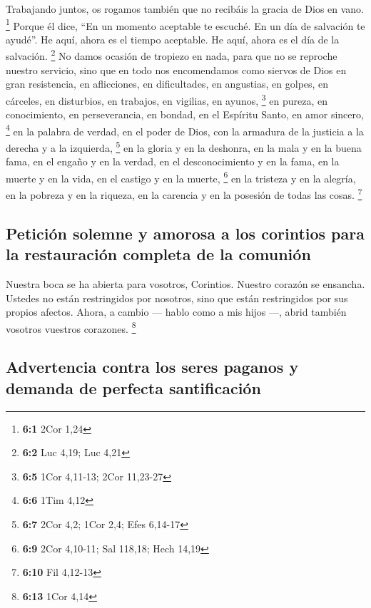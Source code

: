 \begin{paracol}{2}
 Trabajando juntos, os rogamos también que no recibáis la
gracia de Dios en vano. \footnote{\textbf{6:1} 2Cor 1,24} 
Porque él dice, ``En un momento aceptable te escuché. En un día de
salvación te ayudé''. He aquí, ahora es el tiempo aceptable. He aquí,
ahora es el día de la salvación. \footnote{\textbf{6:2} Luc 4,19; Luc
  4,21}  No damos ocasión de tropiezo en nada, para que no
se reproche nuestro servicio,  sino que en todo nos
encomendamos como siervos de Dios en gran resistencia, en aflicciones,
en dificultades, en angustias,  en golpes, en cárceles, en
disturbios, en trabajos, en vigilias, en ayunos, \footnote{\textbf{6:5}
  1Cor 4,11-13; 2Cor 11,23-27}  en pureza, en
conocimiento, en perseverancia, en bondad, en el Espíritu Santo, en amor
sincero, \footnote{\textbf{6:6} 1Tim 4,12}  en la palabra
de verdad, en el poder de Dios, con la armadura de la justicia a la
derecha y a la izquierda, \footnote{\textbf{6:7} 2Cor 4,2; 1Cor 2,4;
  Efes 6,14-17}  en la gloria y en la deshonra, en la mala
y en la buena fama, en el engaño y en la verdad,  en el
desconocimiento y en la fama, en la muerte y en la vida, en el castigo y
en la muerte, \footnote{\textbf{6:9} 2Cor 4,10-11; Sal 118,18; Hech
  14,19}  en la tristeza y en la alegría, en la pobreza y
en la riqueza, en la carencia y en la posesión de todas las cosas.
\footnote{\textbf{6:10} Fil 4,12-13}

\hypertarget{peticiuxf3n-solemne-y-amorosa-a-los-corintios-para-la-restauraciuxf3n-completa-de-la-comuniuxf3n}{%
\subsection{Petición solemne y amorosa a los corintios para la
restauración completa de la
comunión}\label{peticiuxf3n-solemne-y-amorosa-a-los-corintios-para-la-restauraciuxf3n-completa-de-la-comuniuxf3n}}

 Nuestra boca se ha abierta para vosotros, Corintios.
Nuestro corazón se ensancha.  Ustedes no están
restringidos por nosotros, sino que están restringidos por sus propios
afectos.  Ahora, a cambio --- hablo como a mis hijos ---,
abrid también vosotros vuestros corazones. \footnote{\textbf{6:13} 1Cor
  4,14}

\hypertarget{advertencia-contra-los-seres-paganos-y-demanda-de-perfecta-santificaciuxf3n}{%
\subsection{Advertencia contra los seres paganos y demanda de perfecta
santificación}\label{advertencia-contra-los-seres-paganos-y-demanda-de-perfecta-santificaciuxf3n}}


\end{paracol}
